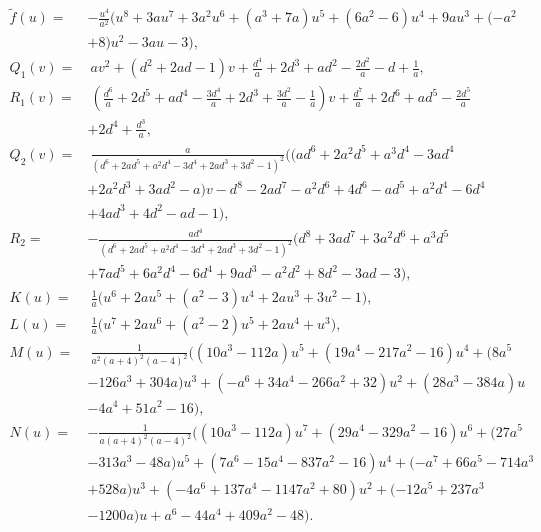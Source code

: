\documentclass{gtpart}
\theoremstyle{definition}
\theoremstyle{remark}
\newcommand{\Tf}{\widetilde{f}}
\begin{document}
\begin{equation*}
\begin{split}
 \Tf(u) = & - \frac{u^4}{a^2} \big( u^8 + 3 a u^7 + 3 a^2 u^6 + (a^3 + 7 a) u^5 + (6 a^2 - 6) u^4 + 9 a u^3 + (-a^2 \\
          & + 8) u^2 - 3 a u - 3 \big), \\
 Q_1(v) = & ~ a v^2 + (d^2 + 2 a d - 1) v + \frac{d^4}{a} + 2 d^3 + a d^2 - \frac{2 d^2}{a} - d + \frac{1}{a}, \\
 R_1(v) = & ~ (\frac{d^6}{a} + 2 d^5 + a d^4 - \frac{3 d^4}{a} + 2 d^3 + \frac{3 d^2}{a} - \frac{1}{a}) v + \frac{d^7}{a} + 2 d^6 + a d^5 - \frac{2 d^5}{a} \qquad \qquad \\
          & + 2 d^4 + \frac{d^3}{a}, 
\end{split}
\end{equation*}
\begin{equation*}
\begin{split}
 Q_2(v) = & ~ \frac{a}{(d^6 + 2 a d^5 + a^2 d^4 - 3 d^4 + 2 a d^3 + 3 d^2 - 1)^2} \big( (a d^6 + 2 a^2 d^5 + a^3 d^4 - 3 a d^4 \\
          & + 2 a^2 d^3 + 3 a d^2 - a) v - d^8 - 2 a d^7 - a^2 d^6 + 4 d^6 - a d^5 + a^2 d^4 - 6 d^4 \\
          & + 4 a d^3 + 4 d^2 - a d - 1 \big), \\
 R_2 = & - \frac{a d^4}{(d^6 + 2 a d^5 + a^2 d^4 - 3 d^4 + 2 a d^3 + 3 d^2 - 1)^2} (d^8 + 3 a d^7 + 3 a^2 d^6 + a^3 d^5 \\
       & + 7 a d^5 + 6 a^2 d^4 - 6 d^4 + 9 a d^3 - a^2 d^2 + 8 d^2 - 3 a d - 3), \\
 K(u) = & ~ \frac{1}{a} \big( u^6 + 2 a u^5 + (a^2 - 3) u^4 + 2 a u^3 + 3 u^2 - 1 \big), \\
 L(u) = & ~ \frac{1}{a} \big( u^7 + 2 a u^6 + (a^2 - 2) u^5 + 2 a u^4 + u^3 \big), \\
 M(u) = & ~ \frac{1}{a^2 (a + 4)^2 (a - 4)^2} \big( (10 a^3 - 112 a) u^5 + (19 a^4 - 217 a^2 - 16) u^4 + (8 a^5 \\
        & - 126 a^3 + 304 a) u^3 + (-a^6 + 34 a^4 - 266 a^2 + 32) u^2 + (28 a^3 - 384 a) u \\
        & - 4 a^4 + 51 a^2 - 16 \big), \\
 N(u) = & - \frac{1}{a (a + 4)^2 (a - 4)^2} \big( (10 a^3 - 112 a) u^7 + (29 a^4 - 329 a^2 - 16) u^6 + (27 a^5 \\
        & - 313 a^3 - 48 a) u^5 + (7 a^6 - 15 a^4 - 837 a^2 - 16) u^4 + (-a^7 + 66 a^5 - 714 a^3 \\
        & + 528 a) u^3 + (-4 a^6 + 137 a^4 - 1147 a^2 + 80) u^2 + (-12 a^5 + 237 a^3 \\
        & - 1200 a) u + a^6 - 44 a^4 + 409 a^2 - 48 \big).  
\end{split}
\end{equation*}
\end{document}
